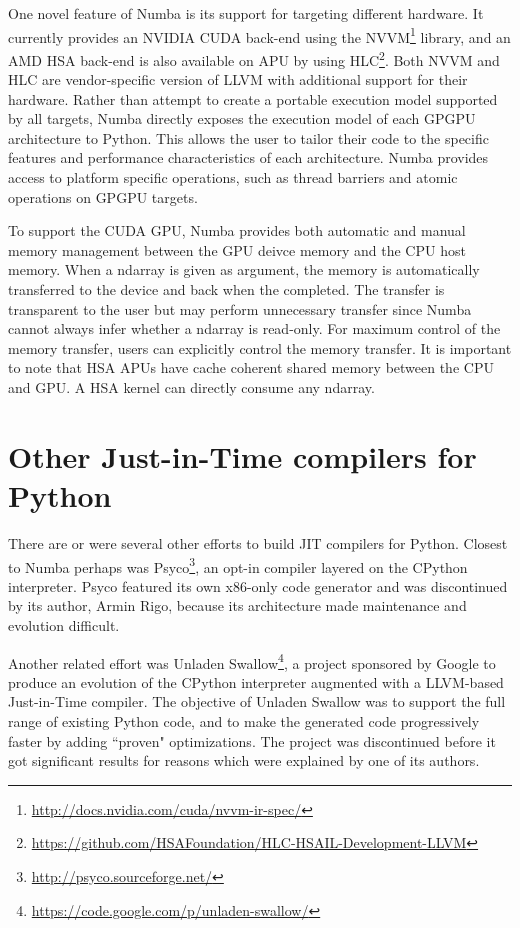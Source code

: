 \documentclass{acm_proc_article-sp}
\begin{document}
One novel feature of Numba is its support for targeting different
hardware.  It currently provides an NVIDIA CUDA\cite{CUDA} back-end using the
NVVM\footnote{\url{http://docs.nvidia.com/cuda/nvvm-ir-spec/}}
library, and an AMD HSA\cite{HSA} back-end is also available on APU by using
HLC\footnote{\url{https://github.com/HSAFoundation/HLC-HSAIL-Development-LLVM}}.
Both NVVM and HLC are vendor-specific version of LLVM with additional
support for their hardware.  Rather than attempt to create a portable
execution model supported by all targets, Numba directly exposes the
execution model of each GPGPU architecture to Python.  This allows the
user to tailor their code to the specific features and performance
characteristics of each architecture.  Numba provides access to
platform specific operations, such as thread barriers and atomic
operations on GPGPU targets.

To support the CUDA GPU, Numba provides both automatic and manual memory
management between the GPU deivce memory and the CPU host memory.
When a ndarray is given as argument, the memory is automatically transferred
to the device and back when the completed. The transfer is transparent
to the user but may perform unnecessary transfer since Numba cannot always
infer whether a ndarray is read-only.  For maximum control of the memory
transfer, users can explicitly control the memory transfer.  It is important
to note that HSA APUs have cache coherent shared memory between the CPU and GPU.
A HSA kernel can directly consume any ndarray.

\section{Other Just-in-Time compilers for Python}

There are or were several other efforts to build JIT compilers for
Python.  Closest to Numba perhaps was
Psyco\footnote{\url{http://psyco.sourceforge.net/}}, an opt-in
compiler layered on the CPython interpreter.  Psyco featured its own
x86-only code generator and was discontinued by its author, Armin
Rigo, because its architecture made maintenance and evolution
difficult. \cite{rigo2004representation}

Another related effort was
Unladen Swallow\footnote{\url{https://code.google.com/p/unladen-swallow/}},
a project sponsored by Google to produce an evolution of the CPython interpreter
augmented with a LLVM-based Just-in-Time compiler.
The objective of Unladen Swallow was to support the full range of existing
Python code, and to make the generated code progressively faster by adding
``proven" optimizations.  The project was discontinued before it got
significant results for reasons which were explained by one of its authors.
\cite{kleckner:unladen_swallow_post_mortem}
\end{document}
